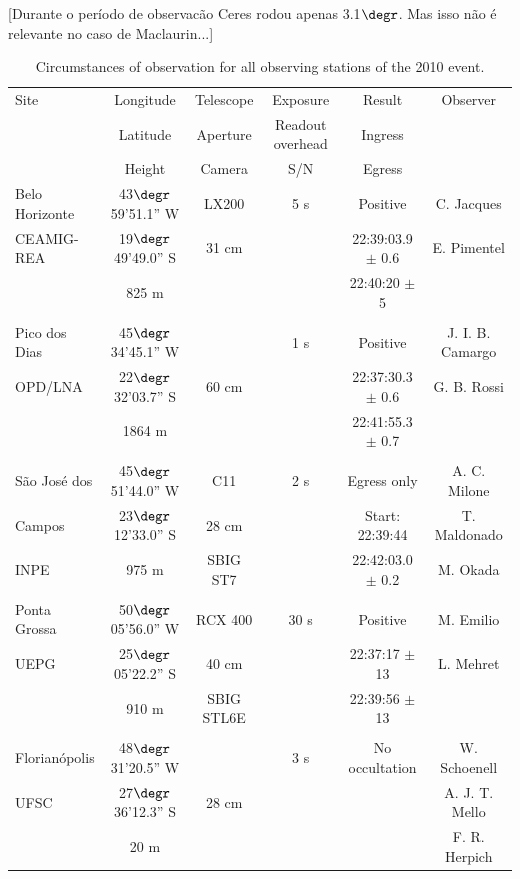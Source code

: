 \documentclass[useAMS,usenatbib]{mn2e}
\begin{document}
[Durante o per\'iodo de observac\~ao Ceres rodou apenas 3.1$\degr$. Mas isso n\~ao \'e relevante no caso de Maclaurin...]

\begin{table}
 \centering
 \begin{minipage}{140mm}
  \caption{Circumstances of observation for all observing stations of the 2010 event.}
  \begin{tabular}{@{}lccccc}
  \hline
     Site & Longitude & Telescope & Exposure & Result & Observer  \\
          & Latitude  & Aperture  & Readout overhead  & Ingress & \\          
          & Height    & Camera    &    S/N    & Egress    & \\          
\hline
 Belo Horizonte & 43$\degr$59'51.1'' W & LX200 & 5 s & Positive & C. Jacques  \\
 CEAMIG-REA &19$\degr$49'49.0'' S & 31 cm &     & 22:39:03.9 $\pm$ 0.6 &  E. Pimentel \\
            & 825 m                &       &     & 22:40:20 $\pm$ 5 &   \\
 & & & & & \\
 Pico dos Dias    & 45$\degr$34'45.1'' W &       & 1 s & Positive & J. I. B. Camargo \\
 OPD/LNA    &22$\degr$32'03.7'' S & 60 cm &     & 22:37:30.3 $\pm$ 0.6 &  G. B. Rossi \\
            & 1864 m               &       &     & 22:41:55.3 $\pm$ 0.7 &              \\
 & & & & & \\
 S\~ao Jos\'e dos       & 45$\degr$51'44.0'' W &  C11  & 2 s & Egress only & A. C. Milone\\
 Campos       &23$\degr$12'33.0'' S & 28 cm &     & Start: 22:39:44 & T. Maldonado\\
 INPE      & 975 m                & SBIG ST7 &     & 22:42:03.0 $\pm$ 0.2 & M. Okada    \\
 & & & & & \\
 Ponta Grossa       & 50$\degr$05'56.0'' W & RCX 400 &30 s & Positive & M. Emilio   \\
 UEPG       &25$\degr$05'22.2'' S & 40 cm &     & 22:37:17 $\pm$ 13 & L. Mehret   \\
            & 910 m                & SBIG STL6E &     & 22:39:56 $\pm$ 13 & \\
 & & & & & \\
 Florian\'opolis       & 48$\degr$31'20.5'' W &       & 3 s & No occultation  & W. Schoenell\\
 UFSC       &27$\degr$36'12.3'' S & 28 cm &     &  & A. J. T. Mello\\
            & 20 m                 &       &     &         & F. R. Herpich \\
\hline
\end{tabular}
\end{minipage}
\end{table}
\end{document}
